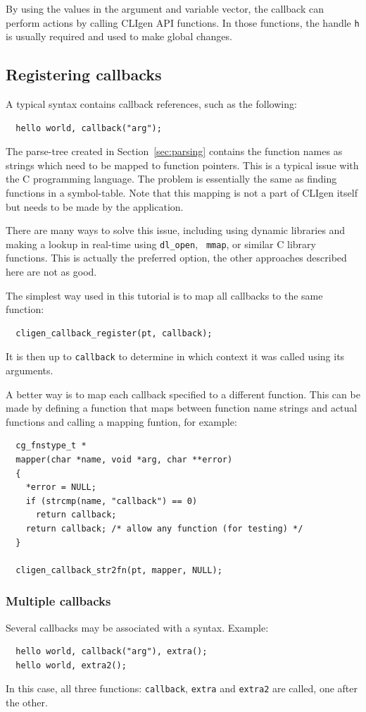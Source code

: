 \documentclass[a4paper, 10pt] {article}
\begin{document}
By using the values in the argument and variable vector, the callback
can perform actions by calling CLIgen API functions. In those
functions, the handle {\tt h} is usually required and used to make
global changes. 

\subsection{Registering callbacks}

A typical syntax contains callback references, such as the following:
\begin{verbatim}
  hello world, callback("arg");
\end{verbatim}

The parse-tree created in Section~\ref{sec:parsing} contains the
function names as strings which need to be mapped to function
pointers. This is a typical issue with the C programming language. The
problem is essentially the same as finding functions in a
symbol-table. Note that this mapping is not a part of CLIgen itself
but needs to be made by the application.

There are many ways to solve this issue, including using dynamic
libraries and making a lookup in real-time using {\tt dl\_open}, {\tt
  mmap}, or similar C library functions. This is actually the
preferred option, the other approaches described here are not as good.

The simplest way used in this tutorial is to map all callbacks to the
same function:
\begin{verbatim}
  cligen_callback_register(pt, callback);
\end{verbatim}
It is then up to {\tt callback} to determine
in which context it was called using its arguments.

A better way is to map each callback specified to a different
function. This can be made by defining a function that maps between
function name strings and actual functions and calling a mapping
funtion, for example:
\begin{verbatim}
  cg_fnstype_t *
  mapper(char *name, void *arg, char **error)
  {
    *error = NULL;
    if (strcmp(name, "callback") == 0)
      return callback;
    return callback; /* allow any function (for testing) */
  }

  cligen_callback_str2fn(pt, mapper, NULL);
\end{verbatim}

\subsubsection{Multiple callbacks}
Several callbacks may be associated with a syntax. Example:
\begin{verbatim}
  hello world, callback("arg"), extra();
  hello world, extra2();
\end{verbatim}
In this case, all three functions: {\tt callback}, {\tt extra} and {\tt extra2} are called, one after the other.
\end{document}
